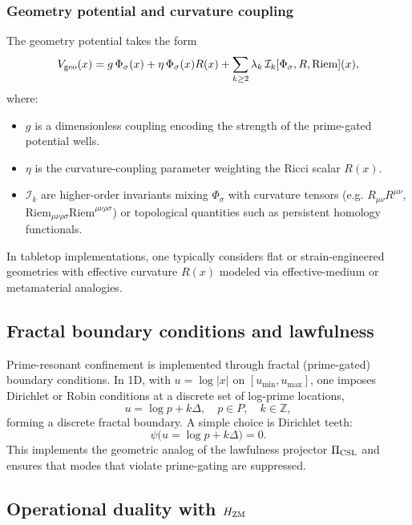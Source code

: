 \documentclass[11pt]{article}
\begin{document}
\subsubsection{Geometry potential and curvature coupling}

The geometry potential takes the form
\begin{equation}
V_{\rm geo}(x)
  = g\,\Phi_\sigma(x)
  + \eta\,\Phi_\sigma(x) R(x)
  + \sum_{k\ge 2}\lambda_k\,\mathcal{I}_k[\Phi_\sigma,R,\text{Riem}](x),
\end{equation}
where:
\begin{itemize}
  \item $g$ is a dimensionless coupling encoding the strength of the prime-gated potential wells.
  \item $\eta$ is the curvature-coupling parameter weighting the Ricci scalar $R(x)$.
  \item $\mathcal{I}_k$ are higher-order invariants mixing $\Phi_\sigma$ with curvature tensors (e.g. $R_{\mu\nu}R^{\mu\nu}$, $\text{Riem}_{\mu\nu\rho\sigma}\text{Riem}^{\mu\nu\rho\sigma}$) or topological quantities such as persistent homology functionals.
\end{itemize}
In tabletop implementations, one typically considers flat or strain-engineered geometries with effective curvature $R(x)$ modeled via effective-medium or metamaterial analogies.

\subsection{Fractal boundary conditions and lawfulness}

Prime-resonant confinement is implemented through fractal (prime-gated) boundary conditions.
In 1D, with $u = \log|x|$ on $[u_{\min},u_{\max}]$, one imposes Dirichlet or Robin conditions at a discrete set of log-prime locations,
\begin{equation}
u = \log p + k\Delta, \quad p\in P,\quad k\in\mathbb{Z},
\end{equation}
forming a discrete fractal boundary.
A simple choice is Dirichlet teeth:
\begin{equation}
\psi\bigl(u=\log p + k\Delta\bigr) = 0.
\end{equation}
This implements the geometric analog of the lawfulness projector $\Pi_{\rm CSL}$ and ensures that modes that violate prime-gating are suppressed.

\subsection{Operational duality with $H_{\rm ZM}$}
\end{document}
